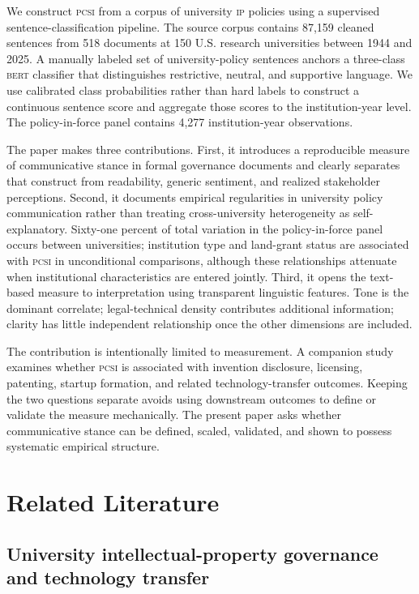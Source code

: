\documentclass[12pt]{article}
\newcommand{\PCSI}{\textsc{pcsi}}
\newcommand{\IP}{\textsc{ip}}
\newcommand{\BERT}{\textsc{bert}}
\begin{document}
We construct \PCSI{} from a corpus of university \IP{} policies using a supervised sentence-classification pipeline. The source corpus contains 87,159 cleaned sentences from 518 documents at 150 U.S. research universities between 1944 and 2025. A manually labeled set of university-policy sentences anchors a three-class \BERT{} classifier that distinguishes restrictive, neutral, and supportive language. We use calibrated class probabilities rather than hard labels to construct a continuous sentence score and aggregate those scores to the institution-year level. The policy-in-force panel contains 4,277 institution-year observations.

The paper makes three contributions. First, it introduces a reproducible measure of communicative stance in formal governance documents and clearly separates that construct from readability, generic sentiment, and realized stakeholder perceptions. Second, it documents empirical regularities in university policy communication rather than treating cross-university heterogeneity as self-explanatory. Sixty-one percent of total variation in the policy-in-force panel occurs between universities; institution type and land-grant status are associated with \PCSI{} in unconditional comparisons, although these relationships attenuate when institutional characteristics are entered jointly. Third, it opens the text-based measure to interpretation using transparent linguistic features. Tone is the dominant correlate; legal-technical density contributes additional information; clarity has little independent relationship once the other dimensions are included.

The contribution is intentionally limited to measurement. A companion study examines whether \PCSI{} is associated with invention disclosure, licensing, patenting, startup formation, and related technology-transfer outcomes. Keeping the two questions separate avoids using downstream outcomes to define or validate the measure mechanically. The present paper asks whether communicative stance can be defined, scaled, validated, and shown to possess systematic empirical structure.

\section{Related Literature}

\subsection{University intellectual-property governance and technology transfer}
\end{document}
